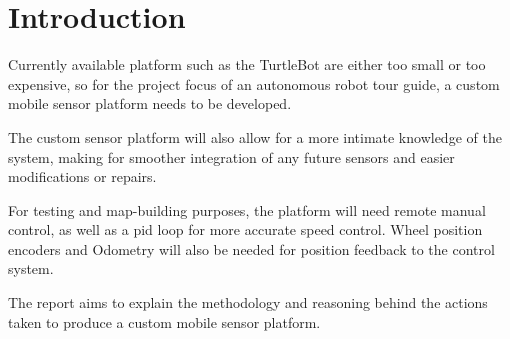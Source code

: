 \chapter{Introduction}
Currently available platform such as the TurtleBot\cite{turtlebot} are either too small or too expensive\cite{turtlebotcost}, so for the project focus of an autonomous robot tour guide, a custom mobile sensor platform needs to be developed.

The custom sensor platform will also allow for a more intimate knowledge of the system, making for smoother integration of any future sensors and easier modifications or repairs.

For testing and map-building purposes, the platform will need remote manual control, as well as a \gls{pid} loop for more accurate speed control. Wheel position encoders and Odometry will also be needed for position feedback to the control system.

The report aims to explain the methodology and reasoning behind the actions taken to produce a custom mobile sensor platform.

